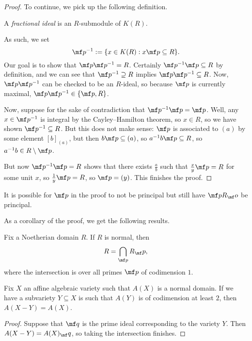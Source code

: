 \begin{proof}
	To continue, we pick up the following definition.
	\begin{definition}
		A \textit{fractional ideal} is an $R$-submodule of $K(R)$.
	\end{definition}
	As such, we set
	\[\mf p^{-1}:=\{x\in K(R):x\mf p\subseteq R\}.\]
	Our goal is to show that $\mf p\mf p^{-1}=R$. Certainly $\mf p^{-1}\mf p\subseteq R$ by definition, and we can see that $\mf p^{-1}\supseteq R$ implies $\mf p\mf p^{-1}\subseteq R$. Now, $\mf p\mf p^{-1}$ can be checked to be an $R$-ideal, so because $\mf p$ is currently maximal, $\mf p\mf p^{-1}\in\{\mf p,R\}$.

	Now, suppose for the sake of contradiction that $\mf p^{-1}\mf p=\mf p$. Well, any $x\in\mf p^{-1}$ is integral by the Cayley--Hamilton theorem, so $x\in R$, so we have shown $\mf p^{-1}\subseteq R$. But this does not make sense: $\mf p$ is associated to $(a)$ by some element $[b]_{(a)}$, but then $b\mf p\subseteq(a)$, so $a^{-1}b\mf p\subseteq R$, so $a^{-1}b\in R\setminus\mf p$.

	But now $\mf p^{-1}\mf p=R$ shows that there exists $\frac ab$ such that $\frac xy\mf p=R$ for some unit $x$, so $\frac1y\mf p=R$, so $\mf p=(y)$. This finishes the proof.
\end{proof}
\begin{remark}
	It is possible for $\mf p$ in the proof to not be principal but still have $\mf pR_\mf o$ be principal.
\end{remark}
As a corollary of the proof, we get the following results.
\begin{corollary}
	Fix a Noetherian domain $R$. If $R$ is normal, then
	\[R=\bigcap_{\mf p}R_\mf p,\]
	where the intersection is over all primes $\mf p$ of codimension $1$.
\end{corollary}
\begin{corollary}
	Fix $X$ an affine algebraic variety such that $A(X)$ is a normal domain. If we have a subvariety $Y\subseteq X$ is such that $A(Y)$ is of codimension at least $2$, then $A(X-Y)=A(X)$.
\end{corollary}
\begin{proof}
	Suppose that $\mf q$ is the prime ideal corresponding to the variety $Y$. Then $A(X-Y)=A(X)_\mf q$, so taking the intersection finishes. %
\end{proof}

